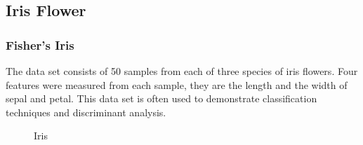 \documentclass{beamer}
\begin{document}
\subsection{Iris Flower}
\begin{frame}
\frametitle{Fisher's Iris}
The data set consists of 50 samples from each of three 
species of iris flowers.  Four features were measured from each
sample, they are the length and the width of sepal and petal. This data set is often used
to demonstrate classification techniques and discriminant analysis.

\begin{figure}[htbp] \centering {}
\hspace{20pt} 
\hspace{20pt} 
\caption{Iris } \end{figure}
\end{frame}
\end{document}

